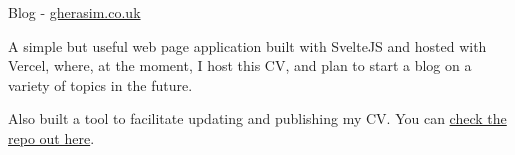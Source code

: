\cventry
    {Blog - \href{https://gherasim.co.uk}{gherasim.co.uk}} %
    {} %
    {} %
    {} %
    {\begin{cvitems}
        \item{A simple but useful web page application built with SvelteJS and hosted with Vercel, where, at the moment, I host this CV, and plan to start a blog on a variety of topics in the future.}
        \item{Also built a tool to facilitate updating and publishing my CV. You can \href{https://github.com/bogdan23a/cv}{check the repo out here}.}
    \end{cvitems}}